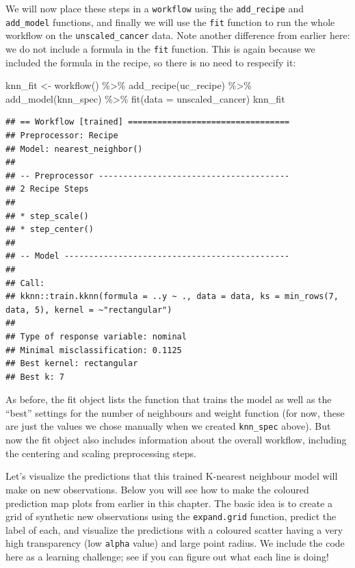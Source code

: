 \documentclass[
]{krantz}
\makeatletter
\newenvironment{Shaded}{\begin{snugshade}}{\end{snugshade}}
\newcommand{\AttributeTok}[1]{\textcolor[rgb]{0.61,0.61,0.61}{#1}}
\newcommand{\FunctionTok}[1]{\textcolor[rgb]{0,0,0}{#1}}
\newcommand{\NormalTok}[1]{#1}
\newcommand{\OtherTok}[1]{\textcolor[rgb]{0.37,0.37,0.37}{#1}}
\newcommand{\SpecialCharTok}[1]{\textcolor[rgb]{0,0,0}{#1}}
\newenvironment{kframe}{%
\medskip{}
\setlength{\fboxsep}{.8em}
 \def\at@end@of@kframe{}%
 \ifinner\ifhmode%
  \def\at@end@of@kframe{\end{minipage}}%
  \begin{minipage}{\columnwidth}%
 \fi\fi%
 \def\FrameCommand##1{\hskip\@totalleftmargin \hskip-\fboxsep
 \colorbox{shadecolor}{##1}\hskip-\fboxsep
     \hskip-\linewidth \hskip-\@totalleftmargin \hskip\columnwidth}%
 \MakeFramed {\advance\hsize-\width
   \@totalleftmargin\z@ \linewidth\hsize
   \@setminipage}}%
 {\par\unskip\endMakeFramed%
 \at@end@of@kframe}
\renewenvironment{Shaded}{\begin{kframe}}{\end{kframe}}
\makeatother
\begin{document}
We will now place these steps in a \texttt{workflow} using the \texttt{add\_recipe} and \texttt{add\_model} functions,
and finally we will use the \texttt{fit} function to run the whole workflow on the \texttt{unscaled\_cancer} data.
Note another difference from earlier here: we do not include a formula in the \texttt{fit} function. This
is again because we included the formula in the recipe, so there is no need to respecify it:

\begin{Shaded}
\begin{Highlighting}[]
\NormalTok{knn\_fit }\OtherTok{\textless{}{-}} \FunctionTok{workflow}\NormalTok{() }\SpecialCharTok{\%\textgreater{}\%}
  \FunctionTok{add\_recipe}\NormalTok{(uc\_recipe) }\SpecialCharTok{\%\textgreater{}\%}
  \FunctionTok{add\_model}\NormalTok{(knn\_spec) }\SpecialCharTok{\%\textgreater{}\%}
  \FunctionTok{fit}\NormalTok{(}\AttributeTok{data =}\NormalTok{ unscaled\_cancer)}
\NormalTok{knn\_fit}
\end{Highlighting}
\end{Shaded}

\begin{verbatim}
## == Workflow [trained] =================================
## Preprocessor: Recipe
## Model: nearest_neighbor()
## 
## -- Preprocessor ---------------------------------------
## 2 Recipe Steps
## 
## * step_scale()
## * step_center()
## 
## -- Model ----------------------------------------------
## 
## Call:
## kknn::train.kknn(formula = ..y ~ ., data = data, ks = min_rows(7,     data, 5), kernel = ~"rectangular")
## 
## Type of response variable: nominal
## Minimal misclassification: 0.1125
## Best kernel: rectangular
## Best k: 7
\end{verbatim}

As before, the fit object lists the function that trains the model as well as the ``best'' settings
for the number of neighbours and weight function (for now, these are just the values we chose
manually when we created \texttt{knn\_spec} above). But now the fit object also includes information about
the overall workflow, including the centering and scaling preprocessing steps.

Let's visualize the predictions that this trained K-nearest neighbour model will make on new observations.
Below you will see how to make the coloured prediction map plots from earlier in this chapter.
The basic idea is to create a grid of synthetic new observations using the \texttt{expand.grid} function,
predict the label of each, and visualize the predictions with a coloured scatter having a very high transparency
(low \texttt{alpha} value) and large point radius. We include the code here as a learning challenge; see
if you can figure out what each line is doing!
\end{document}
